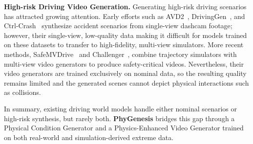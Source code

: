 \documentclass[runningheads]{llncs}
\begin{document}
\setlength{\parskip}{1pt}
\noindent\textbf{High-risk Driving Video Generation.} Generating high-risk driving scenarios has attracted growing attention. 
Early efforts such as AVD2~\cite{li2025avd2}, DrivingGen~\cite{guo2024drivinggen}, and Ctrl-Crash~\cite{gosselin2025ctrlcrash} synthesize accident scenarios from single-view dashcam footage; however, their single-view, low-quality data making it difficult for models trained on these datasets to transfer to high-fidelity, multi-view simulators.
More recent methods, SafeMVDrive~\cite{zhou2025safemvdrive} and Challenger~\cite{xu2025challenger}, combine trajectory simulators with multi-view video generators to produce safety-critical videos. Nevertheless, their video generators are trained exclusively on nominal data, so the resulting quality remains limited and the generated scenes cannot depict physical interactions such as collisions.



In summary, existing driving world models handle either nominal scenarios or high-risk synthesis, but rarely both. \textbf{PhyGenesis} bridges this gap through a Physical Condition Generator and a Physics-Enhanced Video Generator trained on both real-world and simulation-derived extreme data.
\end{document}
